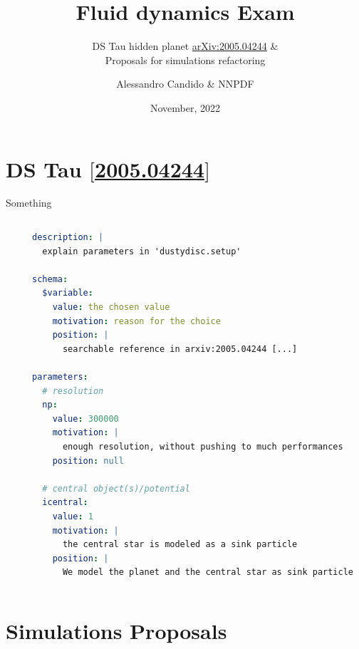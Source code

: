 \documentclass[9pt]{beamer}
\title{Fluid dynamics Exam}
\subtitle{
    DS Tau hidden planet \href{https://arxiv.org/abs/2005.04244}{arXiv:2005.04244} \&\\
    Proposals for simulations refactoring
}
\date{November, 2022}
\author{Alessandro Candido \& \textsc{NNPDF}}
\providecommand{\iRef}[1]{{\color{mLightGreen}\small $[$#1$]$}}
\begin{document}
\maketitle


\section{DS Tau \iRef{\href{https://arxiv.org/abs/2005.04244}{2005.04244}}}

\begin{frame}[fragile]{Something}
    \begin{columns}
        \begin{column}{0.5\textwidth}
        \end{column}
        \begin{column}{0.5\textwidth}
            \begin{lstlisting}[language=yaml, style=mystyle, breaklines=true]
description: |
  explain parameters in 'dustydisc.setup'

schema:
  $variable:
    value: the chosen value
    motivation: reason for the choice
    position: |
      searchable reference in arxiv:2005.04244 [...]

parameters:
  # resolution
  np:
    value: 300000
    motivation: |
      enough resolution, without pushing to much performances
    position: null

  # central object(s)/potential
  icentral:
    value: 1
    motivation: |
      the central star is modeled as a sink particle
    position: |
      We model the planet and the central star as sink particle\end{lstlisting}
        \end{column}
    \end{columns}
\end{frame}

\section{Simulations Proposals}
\end{document}
